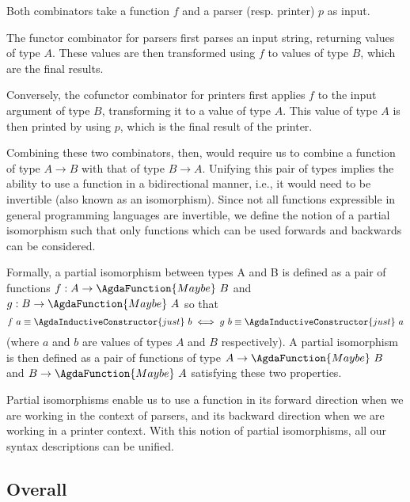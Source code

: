 \documentclass[12pt,a4paper,twoside,openright]{report}
\newcommand{\C}{\AgdaInductiveConstructor}
\newcommand{\F}{\AgdaFunction}
\begin{document}
Both combinators take a function $f$ and a parser (resp. printer) $p$ as input.

The functor combinator for parsers first parses an input string, returning values of type {$A$}. These values are then transformed using $f$ to values of type {$B$}, which are the final results.

Conversely, the cofunctor combinator for printers first applies $f$ to the input argument of type {$B$}, transforming it to a value of type {$A$}. This value of type {$A$} is then printed by using $p$, which is the final result of the printer.

Combining these two combinators, then, would require us to combine a function of type $A \to B$ with that of type $B \to A$. Unifying this pair of types implies the ability to use a function in a bidirectional manner, i.e., it would need to be invertible (also known as an isomorphism).  
Since not all functions expressible in general programming languages are invertible, we define the notion of a partial isomorphism such that only functions which can be used forwards and backwards can be considered.


Formally, a partial isomorphism between types A and B is defined as a pair of functions $f : A \to \F{Maybe}\ B$ and $g : B \to \F{Maybe}\ A$ so that $$f\ a \equiv \C{just}\ b \iff g\ b \equiv \C{just}\ a$$ (where $a$ and $b$ are values of types $A$ and $B$ respectively).
A partial isomorphism is then defined as a pair of functions of type $A \to \F{Maybe}\ B$ and $B \to \F{Maybe}\ A$ satisfying these two properties.

Partial isomorphisms enable us to use a function in its forward direction when we are working in the context of parsers, and its backward direction when we are working in a printer context. With this notion of partial isomorphisms, all our syntax descriptions can be unified.

\subsection{Overall}
\end{document}

